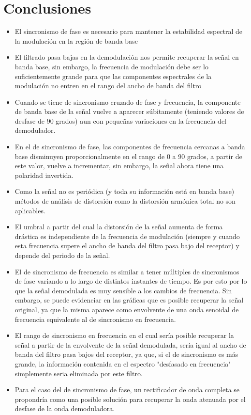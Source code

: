 \section{Conclusiones}%
\label{sec:conclusiones}
\begin{itemize}
    \item El sincronismo de fase es necesario para mantener la estabilidad espectral de la modulación en la región de banda base
    \item El filtrado pasa bajas en la demodulación nos permite recuperar la señal en banda base, sin embargo, la frecuencia de modulación debe ser lo suficientemente grande para que las componentes espectrales de la modulación no entren en el rango del ancho de banda del filtro
    \item Cuando se tiene de-sincronismo cruzado de fase y frecuencia, la componente de banda base de la señal vuelve a aparecer súbitamente (teniendo valores de desfase de 90 grados) aun con pequeñas variaciones en la frecuencia del demodulador.
    \item En el de sincronismo de fase, las componentes de frecuencia cercanas a banda base disminuyen proporcionalmente en el rango de 0 a 90 grados, a partir de este valor, vuelve a incrementar, sin embargo, la señal ahora tiene una polaridad invertida.
    \item Como la señal no es periódica (y toda su información está en banda base) métodos de análisis de distorsión como la distorsión armónica total no son aplicables.
    \item El umbral a partir del cual la distorsión de la señal aumenta de forma drástica es independiente de la frecuencia de modulación (siempre y cuando esta frecuencia supere el ancho de banda del filtro pasa bajo del receptor) y depende del periodo de la señal.
    \item El de sincronismo de frecuencia es similar a tener múltiples de sincronismos de fase variando a lo largo de distintos instantes de tiempo. Es por esto por lo que la señal demodulada es muy sensible a los cambios de frecuencia. Sin embargo, se puede evidenciar en las gráficas que es posible recuperar la señal original, ya que la misma aparece como envolvente de una onda senoidal de frecuencia equivalente al de sincronismo en frecuencia.
    \item El rango de sincronismo en frecuencia en el cual sería posible recuperar la señal a partir de la envolvente de la señal demodulada, sería igual al ancho de banda del filtro pasa bajos del receptor, ya que, si el de sincronismo es más grande, la información contenida en el espectro "desfasado en frecuencia" simplemente seria eliminada por este filtro.
    \item Para el caso del de sincronismo de fase, un rectificador de onda completa se propondría como una posible solución para recuperar la onda atenuada por el desfase de la onda demoduladora.
\end{itemize}

